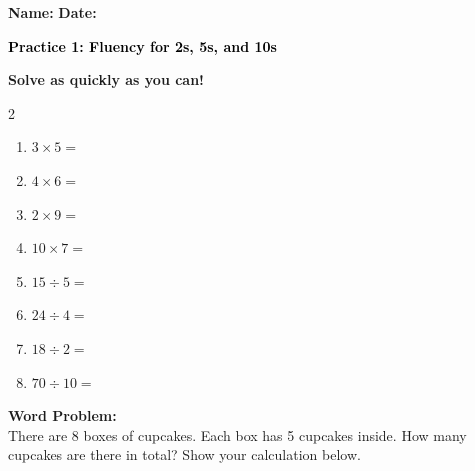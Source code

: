 \documentclass[12pt, letterpaper, fleqn]{article}
\newcommand{\blank}{\underline{\hspace{2.2cm}}}
\begin{document}
\textbf{Name:} \underline{\hspace{5cm}}
\hfill
\textbf{Date:} \underline{\hspace{3cm}}\\

\begin{tcolorbox}[colback=customteal!20]
    \large\textcolor{black}{\textbf{Practice 1: Fluency for 2s, 5s, and 10s}}
\end{tcolorbox}

\vspace{5mm}
\noindent
\textbf{Solve as quickly as you can!}

\vspace{5mm}
\begin{multicols}{2}
\begin{enumerate}[itemsep=1.2cm]
\item $3 \times 5 =$ \blank
\item $4 \times 6 =$ \blank
\item $2 \times 9 =$ \blank
\item $10 \times 7 =$ \blank
\item $15 \div 5 =$ \blank
\item $24 \div 4 =$ \blank
\item $18 \div 2 =$ \blank
\item $70 \div 10 =$ \blank
\end{enumerate}
\end{multicols}

\vspace{1.5cm}
\noindent
\textbf{Word Problem:}
\\
\noindent
There are 8 boxes of cupcakes. Each box has 5 cupcakes inside. How many cupcakes are there in total? Show your calculation below.
\vspace{3cm}
\end{document}
